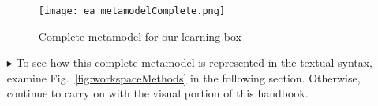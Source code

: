 \begin{enumerate}
\begin{figure}[htbp]
	\centering
  \texttt{[image: ea\_metamodelComplete.png]}
\caption[Complete metamodel for our learning box.]{Complete metamodel for our learning box}
	\label{fig:metamodel_complete}
\end{figure}

\item[$\blacktriangleright$] To see how this complete metamodel is represented in the textual syntax, examine Fig.~\ref{fig:workspaceMethods} in the following
section. Otherwise, continue to carry on with the visual portion of this handbook.

\end{enumerate}

